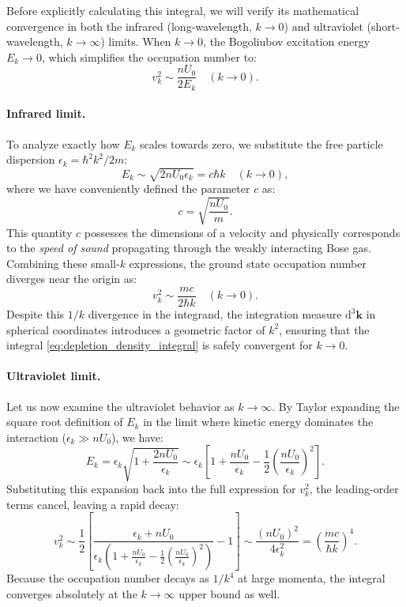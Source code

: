 Before explicitly calculating this integral, we will verify its mathematical convergence in both the infrared (long-wavelength, $k \to 0$) and ultraviolet (short-wavelength, $k \to \infty$) limits.
When $k \to 0$, the Bogoliubov excitation energy $E_k \to 0$, which simplifies the occupation number to:
\[
    v_k^2 \sim \frac{nU_0}{2E_k} \quad (k \to 0).
\]

\paragraph{Infrared limit.}
To analyze exactly how $E_k$ scales towards zero, we substitute the free particle dispersion $\epsilon_k = \hbar^2 k^2 / 2m$:
\[
    E_k \sim \sqrt{2nU_0\epsilon_k} = c\hbar k \quad (k \to 0),
\]
where we have conveniently defined the parameter $c$ as:
\begin{equation} \label{eq:sound_velocity}
    c = \sqrt{\frac{nU_0}{m}}.
\end{equation}
This quantity $c$ possesses the dimensions of a velocity and physically corresponds to the \textit{speed of sound} propagating through the weakly interacting Bose gas. Combining these small-$k$ expressions, the ground state occupation number diverges near the origin as:
\[
    v_k^2 \sim \frac{mc}{2\hbar k} \quad (k \to 0).
\]
Despite this $1/k$ divergence in the integrand, the integration measure $\mathrm{d}^3\mathbf{k}$ in spherical coordinates introduces a geometric factor of $k^2$, ensuring that the integral \eqref{eq:depletion_density_integral} is safely convergent for $k \to 0$.

\paragraph{Ultraviolet limit.}
Let us now examine the ultraviolet behavior as $k \to \infty$. By Taylor expanding the square root definition of $E_k$ in the limit where kinetic energy dominates the interaction ($\epsilon_k \gg nU_0$), we have:
\[
    E_k = \epsilon_k \sqrt{1 + \frac{2nU_0}{\epsilon_k}} \sim \epsilon_k \left[ 1 + \frac{nU_0}{\epsilon_k} - \frac{1}{2} \left(\frac{nU_0}{\epsilon_k}\right)^2 \right].
\]
Substituting this expansion back into the full expression for $v_k^2$, the leading-order terms cancel, leaving a rapid decay:
\[
    v_k^2 \sim \frac{1}{2} \left[ \frac{\epsilon_k + nU_0}{\epsilon_k \left( 1 + \frac{nU_0}{\epsilon_k} - \frac{1}{2} \left(\frac{nU_0}{\epsilon_k}\right)^2 \right)} - 1 \right] \sim \frac{(nU_0)^2}{4\epsilon_k^2} = \left(\frac{mc}{\hbar k}\right)^4.
\]
Because the occupation number decays as $1/k^4$ at large momenta, the integral converges absolutely at the $k \to \infty$ upper bound as well.

